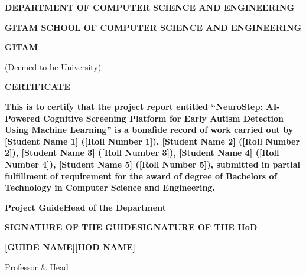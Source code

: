 \documentclass[12pt,letterpaper]{article}
\begin{document}
\begin{center}

\vspace*{1cm}


\vspace{0.5cm}

{\fontsize{14}{17}\selectfont\textbf{DEPARTMENT OF COMPUTER SCIENCE AND ENGINEERING}}

\vspace{0.3cm}

{\fontsize{13}{16}\selectfont\textbf{GITAM SCHOOL OF COMPUTER SCIENCE AND ENGINEERING}}

{\fontsize{14}{17}\selectfont\textbf{GITAM}}

{\normalfont (Deemed to be University)}

\vspace{0.5cm}

\vspace{1cm}

{\fontsize{14}{17}\selectfont\textbf{CERTIFICATE}}

\end{center}

\vspace{1cm}

\textbf{This is to certify that the project report entitled ``NeuroStep: AI-Powered Cognitive Screening Platform for Early Autism Detection Using Machine Learning'' is a bonafide record of work carried out by [Student Name 1] ([Roll Number 1]), [Student Name 2] ([Roll Number 2]), [Student Name 3] ([Roll Number 3]), [Student Name 4] ([Roll Number 4]), [Student Name 5] ([Roll Number 5]), submitted in partial fulfillment of requirement for the award of degree of Bachelors of Technology in Computer Science and Engineering.}

\vspace{3cm}

\noindent\textbf{Project Guide\hfill Head of the Department}

\vspace{2cm}

\noindent\textbf{SIGNATURE OF THE GUIDE\hfill SIGNATURE OF THE HoD}

\vspace{1cm}

\noindent\textbf{[GUIDE NAME]\hfill [HOD NAME]}

\hfill Professor \& Head
\end{document}
